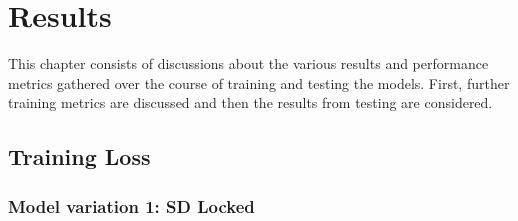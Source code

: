 


\chapter{Results} %

\ifpdf
    \graphicspath{{5_Results/figures/PNG/}{5_Results/figures/PDF/}{5_Results/figures/}}
\else
    \graphicspath{{5_Results/figures/EPS/}{5_Results/figures/}}
\fi

This chapter consists of discussions about the various results and performance metrics gathered over the course of training and testing the models. First, further training metrics are discussed and then the results from testing are considered.

\section{Training Loss}

\subsection{Model variation 1: SD Locked}

